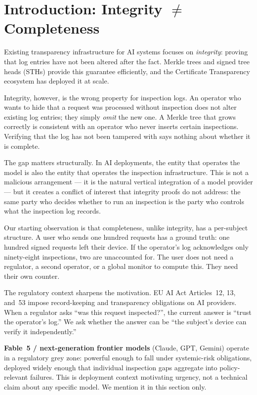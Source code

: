 \documentclass[11pt,a4paper]{article}
\newcommand{\term}[1]{\emph{#1}}
\begin{document}
\tableofcontents
\newpage

\section{Introduction: Integrity $\neq$ Completeness}

Existing transparency infrastructure for AI systems focuses on \term{integrity}: proving
that log entries have not been altered after the fact. Merkle trees and signed tree heads
(STHs) provide this guarantee efficiently, and the Certificate Transparency ecosystem has
deployed it at scale.

Integrity, however, is the wrong property for inspection logs. An operator who wants to
hide that a request was processed without inspection does not alter existing log entries;
they simply \term{omit} the new one. A Merkle tree that grows correctly is consistent
with an operator who never inserts certain inspections. Verifying that the log has not
been tampered with says nothing about whether it is complete.

The gap matters structurally. In AI deployments, the entity that operates the model is
also the entity that operates the inspection infrastructure. This is not a malicious
arrangement --- it is the natural vertical integration of a model provider --- but it
creates a conflict of interest that integrity proofs do not address: the same party who
decides whether to run an inspection is the party who controls what the inspection log
records.

Our starting observation is that completeness, unlike integrity, has a per-subject
structure. A user who sends one hundred requests has a ground truth: one hundred signed
requests left their device. If the operator's log acknowledges only ninety-eight
inspections, two are unaccounted for. The user does not need a regulator, a second
operator, or a global monitor to compute this. They need their own counter.

The regulatory context sharpens the motivation. EU AI Act Articles~12, 13, and~53
impose record-keeping and transparency obligations on AI providers. When a regulator
asks ``was this request inspected?'', the current answer is ``trust the operator's
log.'' We ask whether the answer can be ``the subject's device can verify it
independently.''

\textbf{Fable~5 / next-generation frontier models} (Claude, GPT, Gemini) operate in a
regulatory grey zone: powerful enough to fall under systemic-risk obligations, deployed
widely enough that individual inspection gaps aggregate into policy-relevant failures.
This is deployment context motivating urgency, not a technical claim about any specific
model. We mention it in this section only.
\end{document}
